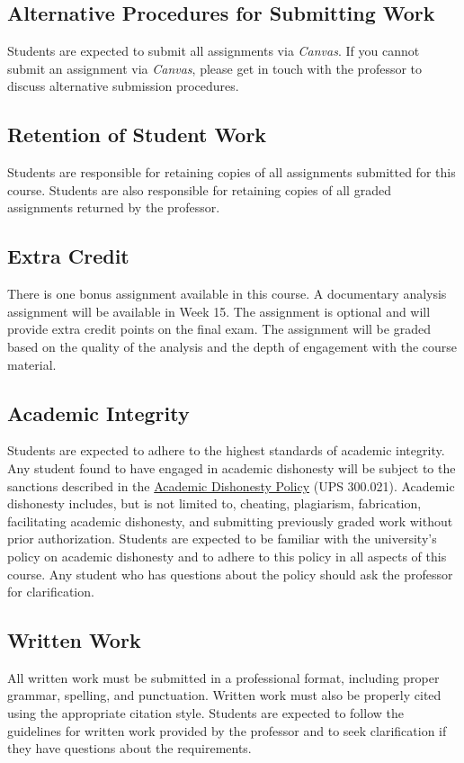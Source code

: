 \documentclass[12pt, letterpaper]{article}
\begin{document}
\subsection*{Alternative Procedures for Submitting Work}
Students are expected to submit all assignments via \emph{Canvas}. If you cannot submit an assignment via \emph{Canvas}, please get in touch with the professor to discuss alternative submission procedures.

\subsection*{Retention of Student Work}
Students are responsible for retaining copies of all assignments submitted for this course. Students are also responsible for retaining copies of all graded assignments returned by the professor.

\subsection*{Extra Credit}
There is one bonus assignment available in this course. A documentary analysis assignment will be available in Week 15. The assignment is optional and will provide extra credit points on the final exam. The assignment will be graded based on the quality of the analysis and the depth of engagement with the course material.

\subsection*{Academic Integrity}
Students are expected to adhere to the highest standards of academic integrity. Any student found to have engaged in academic dishonesty will be subject to the sanctions described in the \href{https://www.fullerton.edu/senate/publications_policies_resolutions/ups/UPS%20300/UPS%20300.021.pdf}{Academic Dishonesty Policy} (UPS 300.021). Academic dishonesty includes, but is not limited to, cheating, plagiarism, fabrication, facilitating academic dishonesty, and submitting previously graded work without prior authorization. Students are expected to be familiar with the university's policy on academic dishonesty and to adhere to this policy in all aspects of this course. Any student who has questions about the policy should ask the professor for clarification.

\subsection*{Written Work}
All written work must be submitted in a professional format, including proper grammar, spelling, and punctuation. Written work must also be properly cited using the appropriate citation style. Students are expected to follow the guidelines for written work provided by the professor and to seek clarification if they have questions about the requirements.
\end{document}
